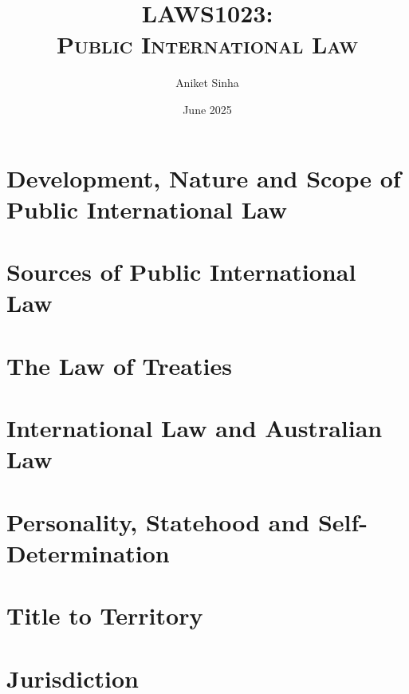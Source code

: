 \documentclass[oneside, 12pt]{book}
\title{\Huge\bfseries\scshape LAWS1023: \\ Public International Law}
\author{Aniket Sinha}
\date{June 2025}
\begin{document}
\maketitle

\frontmatter

\tableofcontents



\flushleft

\mainmatter

\chapter{Development, Nature and Scope of Public International Law}


\chapter{Sources of Public International Law}


\chapter{The Law of Treaties}


\chapter{International Law and Australian Law}


\chapter{Personality, Statehood and Self-Determination}


\chapter{Title to Territory}


\chapter{Jurisdiction}

\end{document}
